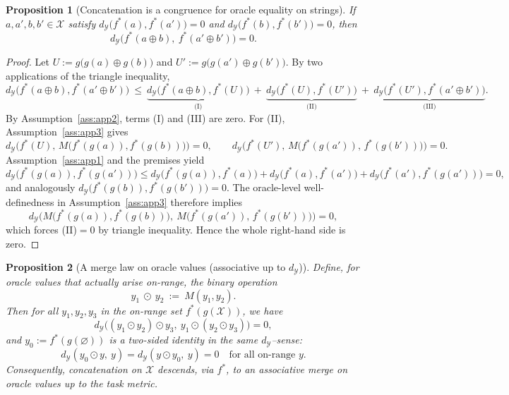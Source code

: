 \documentclass[11pt]{article}
\newtheorem{proposition}{Proposition}
\newcommand{\Strings}{\mathcal{X}}       %
\newcommand{\Y}{\mathcal{Y}}               %
\newcommand{\fstar}{f^*}               %
\newcommand{\concat}{\oplus}                    %
\newcommand{\metric}{d_{\Y}}
\newcommand{\emptystr}{\varnothing}              %
\begin{document}
\begin{proposition}[Concatenation is a congruence for oracle equality on strings]\label{prop:congruence-strings}
If $a,a',b,b'\in\Strings$ satisfy $\metric\!\big(\fstar(a),\fstar(a')\big)=0$ and $\metric\!\big(\fstar(b),\fstar(b')\big)=0$, then
\[
\metric\!\big(\fstar(a\concat b),\ \fstar(a'\concat b')\big)=0.
\]
\end{proposition}

\begin{proof}
Let $U:=g\big(g(a)\concat g(b)\big)$ and $U':=g\big(g(a')\concat g(b')\big)$. By two applications of the triangle inequality,
\[
\metric\!\big(\fstar(a\concat b),\fstar(a'\concat b')\big)\ \le\ 
\underbrace{\metric\!\big(\fstar(a\concat b),\fstar(U)\big)}_{\text{(I)}}\ +\
\underbrace{\metric\!\big(\fstar(U),\fstar(U')\big)}_{\text{(II)}}\ +\
\underbrace{\metric\!\big(\fstar(U'),\fstar(a'\concat b')\big)}_{\text{(III)}}.
\]
By Assumption~\ref{ass:app2}, terms (I) and (III) are zero. For (II), Assumption~\ref{ass:app3} gives
\[
\metric\!\Big(\fstar(U),\,M\big(\fstar(g(a)),\fstar(g(b))\big)\Big)=0,\qquad
\metric\!\Big(\fstar(U'),\,M\big(\fstar(g(a')),\,\fstar(g(b'))\big)\Big)=0.
\]
Assumption~\ref{ass:app1} and the premises yield
\[
\metric\!\big(\fstar(g(a)),\fstar(g(a'))\big)\le \metric\!\big(\fstar(g(a)),\fstar(a)\big)+\metric\!\big(\fstar(a),\fstar(a')\big)+\metric\!\big(\fstar(a'),\fstar(g(a'))\big)=0,
\]
and analogously $\metric\!\big(\fstar(g(b)),\fstar(g(b'))\big)=0$. The oracle-level well-definedness in Assumption~\ref{ass:app3} therefore implies
\[
\metric\!\Big(M\big(\fstar(g(a)),\fstar(g(b))\big),\ M\big(\fstar(g(a')),\,\fstar(g(b'))\big)\Big)=0,
\]
which forces (II)$=0$ by triangle inequality. Hence the whole right-hand side is zero.
\end{proof}

\begin{proposition}[A merge law on oracle values (associative up to $\metric$)]\label{prop:odot}
Define, for oracle values that actually arise on-range, the binary operation
\[
y_1\ \odot\ y_2\ :=\ M(y_1,y_2).
\]
Then for all $y_1,y_2,y_3$ in the on-range set $\fstar(g(\Strings))$, we have
\[
\metric\!\Big((y_1\odot y_2)\odot y_3,\ y_1\odot(y_2\odot y_3)\Big)=0,
\]
and $y_0:=\fstar(g(\emptystr))$ is a two-sided identity in the same $\metric$–sense:
\[
\metric(y_0\odot y,\ y)=\metric(y\odot y_0,\ y)=0\quad\text{for all on-range }y.
\]
Consequently, concatenation on $\Strings$ descends, via $\fstar$, to an associative merge on oracle values \emph{up to the task metric}.
\end{proposition}
\end{document}
